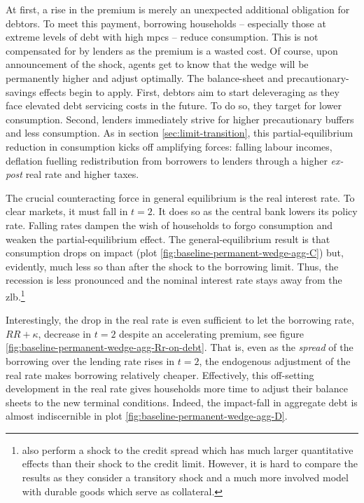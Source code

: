 \documentclass[a4paper,12pt]{article} %
\numberwithin{equation}{section} %
\numberwithin{figure}{section}
\numberwithin{table}{section}
\begin{document}
At first, a rise in the premium is merely an unexpected additional obligation for debtors. To meet this payment, borrowing households -- especially those at extreme levels of debt with high \Gls{mpc}s -- reduce consumption. This is not compensated for by lenders as the premium is a wasted cost. Of course, upon announcement of the shock, agents get to know that the wedge will be permanently higher and adjust optimally. The balance-sheet and precautionary-savings effects begin to apply. First, debtors aim to start deleveraging as they face elevated debt servicing costs in the future. To do so, they target for lower consumption. Second, lenders immediately strive for higher precautionary buffers and less consumption. As in section \ref{sec:limit-transition}, this partial-equilibrium reduction in consumption kicks off amplifying forces: falling labour incomes, deflation fuelling redistribution from borrowers to lenders through a higher \textit{ex-post} real rate and higher taxes. 

The crucial counteracting force in general equilibrium is the real interest rate. To clear markets, it must fall in $t=2$. It does so as the central bank lowers its policy rate. Falling rates dampen the wish of households to forgo consumption and weaken the partial-equilibrium effect. The general-equilibrium result is that consumption drops on impact (plot \ref{fig:baseline-permanent-wedge-agg-C}) but, evidently, much less so than after the shock to the borrowing limit. Thus, the recession is less pronounced and the nominal interest rate stays away from the \Gls{zlb}.\footnote{\textcite{gl2017} also perform a shock to the credit spread which has much larger quantitative effects than their shock to the credit limit. However, it is hard to compare the results as they consider a transitory shock and a much more involved model with durable goods which serve as collateral.} 

Interestingly, the drop in the real rate is even sufficient to let the borrowing rate, $RR + \kappa$, decrease in $t=2$ despite an accelerating premium, see figure \ref{fig:baseline-permanent-wedge-agg-Rr-on-debt}. That is, even as the \textit{spread} of the borrowing over the lending rate rises in $t=2$, the endogenous adjustment of the real rate makes borrowing relatively cheaper. Effectively, this off-setting development in the real rate gives households more time to adjust their balance sheets to the new terminal conditions. Indeed, the impact-fall in aggregate debt is almost indiscernible in plot \ref{fig:baseline-permanent-wedge-agg-D}.
\end{document}
